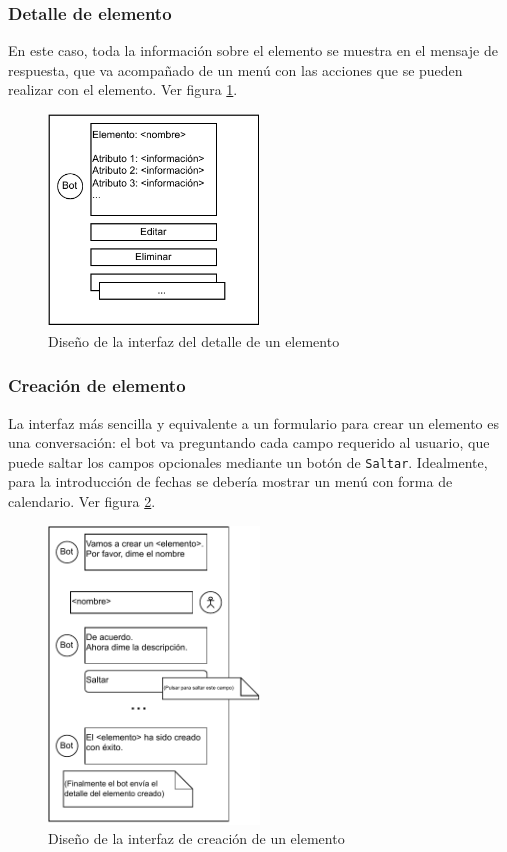 \subsubsection{Detalle de elemento}

En este caso, toda la información sobre el elemento se muestra en el mensaje de respuesta, que va acompañado de un menú con las acciones que se pueden realizar con el elemento. Ver figura \ref{fig:disenyo_detalle}.

\begin{figure}[h]
\centering
\includegraphics[width=0.5\textwidth]{imagenes/disenyo_interfaz/detalle.drawio.pdf}
\caption{Diseño de la interfaz del detalle de un elemento}
\label{fig:disenyo_detalle}
\end{figure}

\subsubsection{Creación de elemento}

La interfaz más sencilla y equivalente a un formulario para crear un elemento es una conversación: el bot va preguntando cada campo requerido al usuario, que puede saltar los campos opcionales mediante un botón de \texttt{Saltar}.
Idealmente, para la introducción de fechas se debería mostrar un menú con forma de calendario. Ver figura \ref{fig:disenyo_creacion}.

\begin{figure}[h]
\centering
\includegraphics[width=0.5\textwidth]{imagenes/disenyo_interfaz/creacion.drawio.pdf}
\caption{Diseño de la interfaz de creación de un elemento}
\label{fig:disenyo_creacion}
\end{figure}

